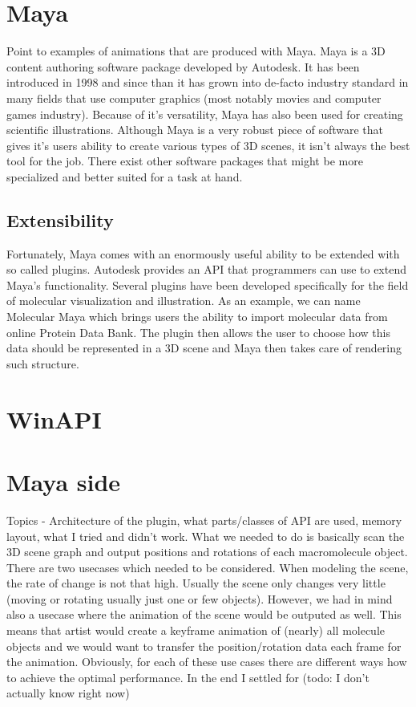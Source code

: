 \documentclass[
  digital, %
  table,   %
  lof,     %
  lot,     %
]{fithesis3}
\begin{document}
\section{Maya}
Point to examples of animations that are produced with Maya.
Maya is a 3D content authoring software package developed by Autodesk. It has been introduced in 1998 and since than it has grown into de-facto industry standard in many fields that use computer graphics (most notably movies and computer games industry). Because of it's versatility, Maya has also been used for creating scientific illustrations.
Although Maya is a very robust piece of software that gives it's users ability to create various types of 3D scenes, it isn't always the best tool for the job. There exist other software packages that might be more specialized and better suited for a task at hand.
\subsection{Extensibility}
Fortunately, Maya comes with an enormously useful ability to be extended with so called plugins. Autodesk provides an API that programmers can use to extend Maya's functionality.
Several plugins have been developed specifically for the field of molecular visualization and illustration. As an example, we can name Molecular Maya which brings users the ability to import molecular data from online Protein Data Bank. The plugin then allows the user to choose how this data should be represented in a 3D scene and Maya then takes care of rendering such structure.

\section{WinAPI}
\section{Maya side}
Topics - Architecture of the plugin, what parts/classes of API are used, memory layout, what I tried and didn't work.
What we needed to do is basically scan the 3D scene graph and output positions and rotations of each macromolecule object. There are two usecases which needed to be considered. When modeling the scene, the rate of change is not that high. Usually the scene only changes very little (moving or rotating usually just one or few objects). However, we had in mind also a usecase where the animation of the scene would be outputed as well. This means that artist would create a keyframe animation of (nearly) all molecule objects and we would want to transfer the position/rotation data each frame for the animation. Obviously, for each of these use cases there are different ways how to achieve the optimal performance. In the end I settled for (todo: I don't actually know right now)
\end{document}
